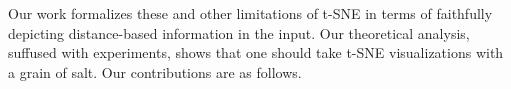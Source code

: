 









Our work formalizes these and other limitations of t-SNE in terms of faithfully depicting distance-based information in the input. Our theoretical analysis, suffused with experiments, shows that one should take 
t-SNE visualizations with a grain of salt. Our contributions are as follows.

